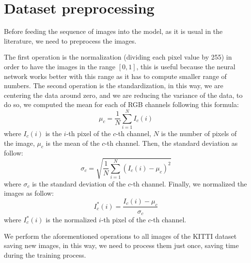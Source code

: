 \section{Dataset preprocessing}\label{sec:dataset-preprocessing}

Before feeding the sequence of images into the model, as it is usual in the literature, we need to preprocess the images.

The first operation is the normalization (dividing each pixel value by 255) in order to have the images in the range $[0,1]$, this is useful because the neural network works better with this range as it has to compute smaller range of numbers.
The second operation is the standardization, in this way, we are centering the data around zero, and we are reducing the variance of the data, to do so, we computed the mean for each of RGB channels following this formula:
\begin{equation}
    \mu_{c} = \frac{1}{N}\sum_{i=1}^{N}I_{c}(i)
    \label{eq:equation_mean}
\end{equation}
where $I_{c}(i)$ is the $i$-th pixel of the $c$-th channel, $N$ is the number of pixels of the image, $\mu_{c}$ is the mean of the $c$-th channel.
Then, the standard deviation as follow:
\begin{equation}
    \sigma_{c} = \sqrt{\frac{1}{N}\sum_{i=1}^{N}(I_{c}(i) - \mu_{c})^{2}}
    \label{eq:equation_std_dev}
\end{equation}
where $\sigma_{c}$ is the standard deviation of the $c$-th channel.
Finally, we normalized the images as follow:
\begin{equation}
    I^*_{c}(i) = \frac{I_{c}(i) - \mu_{c}}{\sigma_{c}}
    \label{eq:equation_normalization}
\end{equation}
where $I^*_{c}(i)$ is the normalized $i$-th pixel of the $c$-th channel.

We perform the aforementioned operations to all images of the KITTI dataset saving new images, in this way, we need to process them just once, saving time during the training process.


